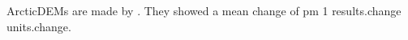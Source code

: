 \documentclass{article}
\begin{document}
ArcticDEMs are made by \citet{porter_arcticdem_2018}.
They showed a mean change of {{pm 1 results.change}} {{units.change}}.



\end{document}
